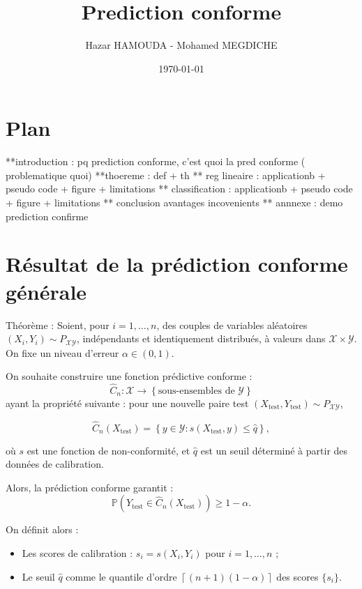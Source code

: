 \documentclass[a4paper,12pt]{article}%
\title{Prediction conforme}
\author{Hazar HAMOUDA - Mohamed MEGDICHE}
\date{\today}
\begin{document}
\maketitle

\section{Plan}

 **introduction : pq prediction conforme, c'est quoi la pred conforme  ( problematique quoi)
 **thoereme : def + th 
 ** reg lineaire  : applicationb + pseudo code + figure  + limitations 
 ** classification : applicationb + pseudo code + figure + limitations 
 ** conclusion avantages incovenients
 ** annnexe  : demo prediction confirme 

\section{Résultat de la prédiction conforme générale}

Théorème : Soient, pour $i = 1, \dots, n$, des couples de variables aléatoires $(X_i, Y_i) \sim P_{\mathcal{X} \mathcal{Y}}$, indépendants et identiquement distribués, à valeurs dans $\mathcal{X} \times \mathcal{Y}$. On fixe un niveau d'erreur $\alpha \in (0,1)$.

On souhaite construire une fonction prédictive conforme :
\[
\hat{C}_n : \mathcal{X} \rightarrow \left\{ \text{sous-ensembles de } \mathcal{Y} \right\}
\]
ayant la propriété suivante : pour une nouvelle paire test $(X_{\text{test}}, Y_{\text{test}}) \sim P_{\mathcal{X} \mathcal{Y}}$,

\[
\hat{C}_n(X_{\text{test}}) = \left\{ y \in \mathcal{Y} : s(X_{\text{test}}, y) \leq \hat{q} \right\},
\]

où $s$ est une fonction de non-conformité, et $\hat{q}$ est un seuil déterminé à partir des données de calibration.

Alors, la prédiction conforme garantit :
\[
\mathbb{P}\left( Y_{\text{test}} \in \hat{C}_n(X_{\text{test}}) \right) \geq 1 - \alpha.
\]

\vspace{0.5em}
On définit alors :
\begin{itemize}
    \item Les scores de calibration : $s_i = s(X_i, Y_i)$ pour $i = 1, \dots, n$ ;
    \item Le seuil $\hat{q}$ comme le quantile d'ordre $\left\lceil (n+1)(1 - \alpha) \right\rceil$ des scores $\{s_i\}$.
\end{itemize}
\end{document}
